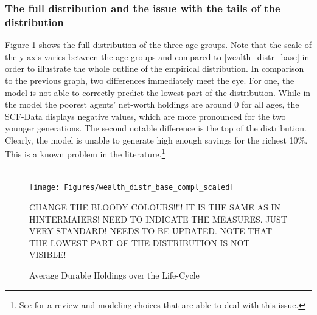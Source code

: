\documentclass[a4paper,12pt]{article}
\begin{document}
\subsubsection{The full distribution and the issue with the tails of the distribution}
Figure \ref{wealth_distr_base_compl} shows the full distribution of the three age groups. Note that the scale of the y-axis varies between the age groups and compared to \ref{wealth_distr_base} in order to illustrate the whole outline of the empirical distribution. In comparison to the previous graph, two differences immediately meet the eye. For one, the model is not able to correctly predict the lowest part of the distribution. While in the model the poorest agents' net-worth holdings are around 0 for all ages, the SCF-Data displays negative values, which are more pronounced for the two younger generations. The second notable difference is the top of the distribution. Clearly, the model is unable to generate high enough savings for the richest 10\%. This is a known problem in the literature.\footnote{See \cite{denardi2017} for a review and modeling choices that are able to deal with this issue.} \\ \\

\begin{figure}[!htbp]
\caption{Average Durable Holdings over the Life-Cycle} 
\label{wealth_distr_base_compl}	%
\centering
\texttt{[image: Figures/wealth\_distr\_base\_compl\_scaled]}  %

\begin{minipage}{0.8\linewidth}
\footnotesize{CHANGE THE BLOODY COLOURS!!!! IT IS THE SAME AS IN HINTERMAIERS! NEED TO INDICATE THE MEASURES. JUST VERY STANDARD! NEEDS TO BE UPDATED. NOTE THAT THE LOWEST PART OF THE DISTRIBUTION IS NOT VISIBLE!}
\end{minipage}

\end{figure}
\end{document}
